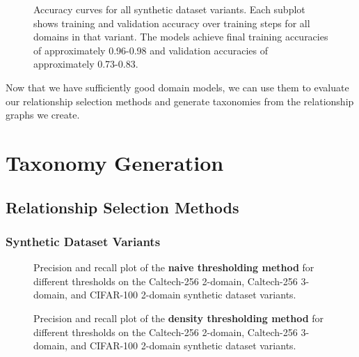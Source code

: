 \begin{figure}[ht]
      \centering
      \scalebox{0.35}{}

      \caption{Accuracy curves for all synthetic dataset variants.
            Each subplot shows training and validation accuracy over training steps for all domains in that variant.
            The models achieve final training accuracies of approximately 0.96-0.98 and validation accuracies of approximately 0.73-0.83.}
      \label{fig:all_training_runs}
\end{figure}



Now that we have sufficiently good domain models,
we can use them to evaluate our relationship selection methods
and generate taxonomies from the relationship graphs we create.

\section{Taxonomy Generation}

\subsection{Relationship Selection Methods} \label{sec:relationship_selection}

\subsubsection{Synthetic Dataset Variants}

\graphicspath{{figures/}}

\begin{figure}[ht]
      \centering
      \scalebox{0.35}{}
      \caption{Precision and recall plot of the \textbf{naive thresholding method}
            for different thresholds on the Caltech-256 2-domain, Caltech-256 3-domain, and CIFAR-100 2-domain synthetic dataset variants.}
      \label{fig:naive_thresholding_precision_recall}
\end{figure}

\begin{figure}[ht]
      \centering
      \scalebox{0.35}{}
      \caption{Precision and recall plot of the \textbf{density thresholding method}
            for different thresholds on the Caltech-256 2-domain, Caltech-256 3-domain, and CIFAR-100 2-domain synthetic dataset variants.}
      \label{fig:density_thresholding_precision_recall}
\end{figure}


